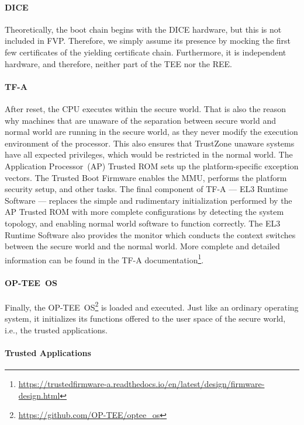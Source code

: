 \paragraph{DICE}
Theoretically, the boot chain begins with the DICE hardware, but this is not included in FVP\@.
Therefore, we simply assume its presence by mocking the first few certificates of the yielding certificate chain.
Furthermore, it is independent hardware, and therefore, neither part of the TEE nor the REE\@.

\paragraph{TF-A}
After reset, the CPU executes within the secure world.
That is also the reason why machines that are unaware of the separation between secure world and normal world are running in the secure world, as they never modify the execution environment of the processor.
This also ensures that TrustZone unaware systems have all expected privileges, which would be restricted in the normal world.
The Application Processor~(AP) Trusted ROM sets up the platform-specific exception vectors.
The Trusted Boot Firmware enables the MMU, performs the platform security setup, and other tasks.
The final component of TF-A --- EL3 Runtime Software --- replaces the simple and rudimentary initialization performed by the AP Trusted ROM with more complete configurations by detecting the system topology, and enabling normal world software to function correctly.
The EL3 Runtime Software also provides the monitor which conducts the context switches between the secure world and the normal world.
More complete and detailed information can be found in the TF-A documentation\footnote{\url{https://trustedfirmware-a.readthedocs.io/en/latest/design/firmware-design.html}}.

\paragraph{OP-TEE~OS}
Finally, the OP-TEE~OS\footnote{\url{https://github.com/OP-TEE/optee_os}} is loaded and executed.
Just like an ordinary operating system, it initializes its functions offered to the user space of the secure world, i.e., the trusted applications.

\paragraph{Trusted Applications}


